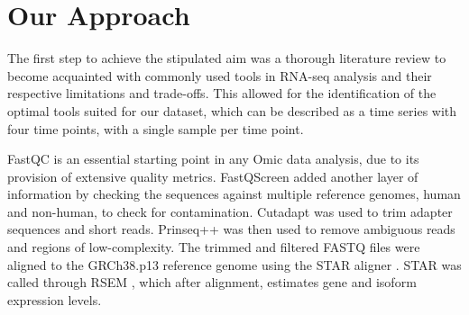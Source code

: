 


\section{Our Approach}
The first step to achieve the stipulated aim was a thorough literature review to become acquainted with commonly used tools in RNA-seq analysis and their respective limitations and trade-offs. This allowed for the identification of the optimal tools suited for our dataset, which can be described as a time series with four time points, with a single sample per time point.

FastQC is an essential starting point in any Omic data analysis, due to its provision of extensive quality metrics. FastQScreen \citep{wingett2018fastq} added another layer of information by checking the sequences against multiple reference genomes, human and non-human, to check for contamination. Cutadapt \citep{martin2011cutadapt} was used to trim adapter sequences and short reads. Prinseq++ \citep{prinseq++} was then used to remove ambiguous reads and regions of low-complexity. The trimmed and filtered FASTQ files were aligned to the GRCh38.p13 reference genome \citep{ref} using the \ac{STAR} aligner \citep{Dobin2013}. \ac{STAR} was called through RSEM \citep{li2011rsem}, which after alignment, estimates gene and isoform expression levels. 

